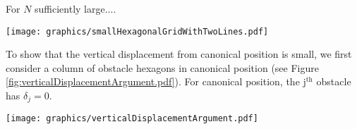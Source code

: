 For $N$ sufficiently large....



\begin{minipage}{\linewidth}
\begin{center}
\texttt{[image: graphics/smallHexagonalGridWithTwoLines.pdf]}
\label{fig:smallHexagonalGridWithTwoLines.pdf}
\end{center}
\end{minipage}

To show that the vertical displacement from canonical position is small, we first consider a column of obstacle hexagons in canonical position (see Figure \ref{fig:verticalDisplacementArgument.pdf}).  
For canonical position, the $\text{j}^\text{th}$ obstacle has $\delta_j = 0$.

\begin{minipage}{\linewidth}
\begin{center}
\texttt{[image: graphics/verticalDisplacementArgument.pdf]}
\label{fig:verticalDisplacementArgument.pdf}
\end{center}
\end{minipage}

